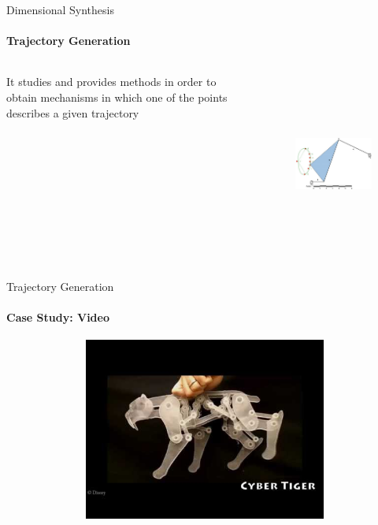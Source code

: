 \documentclass[aspectratio=169]{beamer}
\begin{document}
\begin{frame}[t]{Dimensional Synthesis}
\framesubtitle{Trajectory Generation}
    \begin{columns}[T,onlytextwidth]
        \begin{column}{0.49\textwidth}
            It studies and provides methods in order to obtain mechanisms in which one of the points describes a given trajectory
        \end{column}
        \begin{column}{0.49\textwidth}
            \vspace{-1cm}
            \begin{figure}[H]
                \centering\includegraphics[height=6cm,width=1\textwidth,keepaspectratio]{traj_gen1.png}
                \label{fig:traj_gen1.png}
            \end{figure}
        \end{column}
    \end{columns}
\end{frame}

\begin{frame}[t]{Trajectory Generation}
    \framesubtitle{Case Study: Video}
    \vspace{-0.6cm}
    \begin{figure}[H]
        \href{https://youtu.be/DfznnKUwywQ}{
            \centering\includegraphics[height=6cm,width=1\textwidth,keepaspectratio]{disney_research_preview.jpg}}
        \label{fig:disney_research_preview.jpg}
    \end{figure}
\end{frame}
\end{document}
